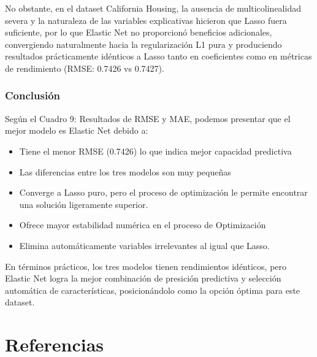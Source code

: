 \documentclass[12pt,a4paper]{article}
\begin{document}
No obstante, en el dataset California Housing, la ausencia de multicolinealidad severa y la naturaleza de las variables explicativas hicieron que Lasso fuera suficiente, por lo que Elastic Net no proporcionó beneficios adicionales, convergiendo naturalmente hacia la regularización L1 pura y produciendo resultados prácticamente idénticos a Lasso tanto en coeficientes como en métricas de rendimiento (RMSE: 0.7426 vs 0.7427).

\subsubsection{Conclusión}

Según el Cuadro 9: Resultados de RMSE y MAE, podemos presentar que el mejor modelo es Elastic Net debido a:

\begin{itemize}
    \item Tiene el menor RMSE (0.7426) lo que indica mejor capacidad predictiva
    \item Las diferencias entre los tres modelos son muy pequeñas
    \item Converge a Lasso puro, pero el proceso de optimización le permite encontrar una solución ligeramente superior.
    \item Ofrece mayor estabilidad numérica en el proceso de Optimización
    \item Elimina automáticamente variables irrelevantes al igual que Lasso.
\end{itemize}

En términos prácticos, los tres modelos tienen rendimientos idénticos, pero Elastic Net logra la mejor combinación de presición predictiva y selección automática de características, posicionándolo como la opción óptima para este dataset.

\section{Referencias}
\end{document}
